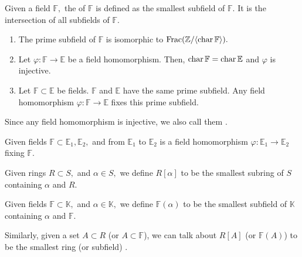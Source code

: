 \begin{defn}%
    Given a field $\mathbb{F},$ the  of $\mathbb{F}$ is defined as the smallest subfield of $\mathbb{F}.$ It is the intersection of all subfields of $\mathbb{F}.$ 
\end{defn}

\begin{prop}
    \phantom{hi}
    \begin{enumerate}
        \item The prime subfield of $\mathbb{F}$ is isomorphic to $\operatorname{Frac}(\mathbb{Z}/\langle \operatorname{char}\mathbb{F}\rangle).$
        \item Let $\varphi : \mathbb{F} \to \mathbb{E}$ be a field homomorphism. Then, $\operatorname{char} \mathbb{F} = \operatorname{char} \mathbb{E}$ and $\varphi$ is injective. 
        \item Let $\mathbb{F} \subset \mathbb{E}$ be fields. $\mathbb{F}$ and $\mathbb{E}$ have the same prime subfield. Any field homomorphism $\varphi : \mathbb{F} \to \mathbb{E}$ fixes this prime subfield.
    \end{enumerate}
\end{prop}

\begin{defn}%
    Since any field homomorphism is injective, we also call them .
\end{defn}

\begin{defn}
    Given fields $\mathbb{F} \subset \mathbb{E}_1, \mathbb{E}_2,$ and  from $\mathbb{E}_1$ to $\mathbb{E}_2$ is a field homomorphism $\varphi : \mathbb{E}_1 \to \mathbb{E}_2$ fixing $\mathbb{F}.$
\end{defn}

\begin{defn}%
    Given rings $R \subset S,$ and $\alpha \in S,$ we define $R[\alpha]$ to be the smallest subring of $S$ containing $\alpha$ and $R.$ 

    Given fields $\mathbb{F} \subset \mathbb{K},$ and $\alpha \in \mathbb{K},$ we define $\mathbb{F}(\alpha)$ to be the smallest subfield of $\mathbb{K}$ containing $\alpha$ and $\mathbb{F}.$ 

    Similarly, given a set $A \subset R$ (or $A \subset \mathbb{F}$), we can talk about $R[A]$ (or $\mathbb{F}(A)$) to be the smallest ring (or subfield) .
\end{defn}

